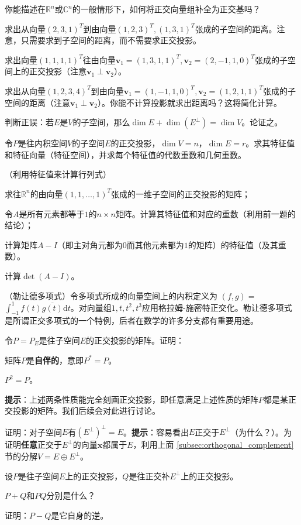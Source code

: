 \begin{problemset}
    你能描述在$\mathbb{R}^n$或$\mathbb{C}^n$的一般情形下，如何将正交向量组补全为正交基吗？
    \item 求出从向量$(2,3,1)^{T}$到由向量$(1,2,3)^T,(1,3,1)^T$张成的子空间的距离。注意，只需要求到子空间的距离，而不需要求正交投影。
    \item 求出向量$(1,1,1,1)^{T}$往由向量$\mathbf{v}_1=(1,3,1,1)^T,\mathbf{v}_2=(2,-1,1,0)^T$张成的子空间上的正交投影（注意$\mathbf{v}_1\perp\mathbf{v}_2$）。
    \item 求出从向量$(1,2,3,4)^{T}$到由向量$\mathbf{v}_1=(1,-1,1,0)^T,\mathbf{v}_2=(1,2,1,1)^T$张成的子空间的距离（注意$\mathbf{v}_1\perp\mathbf{v}_2$）。你能不计算投影就求出距离吗？这将简化计算。
    \item 判断正误：若$E$是$V$的子空间，那么$\dim E + \dim (E^\perp) = \dim V$。论证之。
    \item 令$P$是往内积空间$V$的子空间$E$的正交投影，$\dim V=n$，$\dim E=r$。求其特征值和特征向量（特征空间），并求每个特征值的代数重数和几何重数。
    \item （利用特征值来计算行列式）
    \begin{probenumerate}
        \item 求往$\mathbb{R}^n$的由向量$(1,1,\dots,1)^T$张成的一维子空间的正交投影的矩阵；
        \item 令$A$是所有元素都等于$1$的$n\times n$矩阵。计算其特征值和对应的重数（利用前一题的结论）；
        \item 计算矩阵$A-I$（即主对角元都为$0$而其他元素都为$1$的矩阵）的特征值（及其重数）。
        \item 计算$\det (A-I)$。
    \end{probenumerate}
    \item （勒让德多项式）令多项式所成的向量空间上的内积定义为 $(f,g)=$\linebreak $\int_{-1}^{1}f(t)\overline{g(t)}\mathrm{d}t$。对向量组$1,t,t^2,t^3$应用格拉姆-施密特正交化。勒让德多项式是所谓正交多项式的一个特例，后者在数学的许多分支都有重要用途。
    \item 令$P=P_E$是往子空间$E$的正交投影的矩阵。证明：
    \begin{probenumerate}
        \item 矩阵$P$是\textbf{自伴的}，意即$P^*=P$。
        \item $P^2=P$。
    \end{probenumerate}
    {\bf 提示}：上述两条性质能完全刻画正交投影，即任意满足上述性质的矩阵$P$都是某正交投影的矩阵。我们后续会对此进行讨论。
    \item \label{ex:5_3_12} 证明：对子空间$E$有$(E^\perp)^\perp=E$。{\bf 提示}：容易看出$E$正交于$E^\perp$（为什么？）。为证明\textbf{任意}正交于$E^\perp$的向量$\mathbf{x}$都属于$E$，利用上面 \ref{subsec:orthogonal_complement} 节的分解$V=E\oplus E^\perp$。
    \item 设$P$是往子空间$E$上的正交投影，$Q$是往正交补$E^\perp$上的正交投影。
    \begin{probenumerate}
        \item $P+Q$和$PQ$分别是什么？
        \item 证明：$P-Q$是它自身的逆。
    \end{probenumerate}
\end{problemset}


